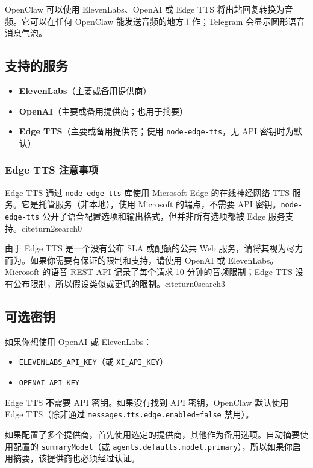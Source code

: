 OpenClaw 可以使用 ElevenLabs、OpenAI 或 Edge TTS 将出站回复转换为音频。它可以在任何 OpenClaw 能发送音频的地方工作；Telegram 会显示圆形语音消息气泡。

\subsection{支持的服务}


\begin{itemize}
  \item \textbf{ElevenLabs}（主要或备用提供商）
  \item \textbf{OpenAI}（主要或备用提供商；也用于摘要）
  \item \textbf{Edge TTS}（主要或备用提供商；使用 \texttt{node-edge-tts}，无 API 密钥时为默认）
\end{itemize}


\subsubsection{Edge TTS 注意事项}


Edge TTS 通过 \texttt{node-edge-tts} 库使用 Microsoft Edge 的在线神经网络 TTS 服务。它是托管服务（非本地），使用 Microsoft 的端点，不需要 API 密钥。\texttt{node-edge-tts} 公开了语音配置选项和输出格式，但并非所有选项都被 Edge 服务支持。citeturn2search0

由于 Edge TTS 是一个没有公布 SLA 或配额的公共 Web 服务，请将其视为尽力而为。如果你需要有保证的限制和支持，请使用 OpenAI 或 ElevenLabs。Microsoft 的语音 REST API 记录了每个请求 10 分钟的音频限制；Edge TTS 没有公布限制，所以假设类似或更低的限制。citeturn0search3

\subsection{可选密钥}


如果你想使用 OpenAI 或 ElevenLabs：

\begin{itemize}
  \item \texttt{ELEVENLABS\_API\_KEY}（或 \texttt{XI\_API\_KEY}）
  \item \texttt{OPENAI\_API\_KEY}
\end{itemize}


Edge TTS \textbf{不}需要 API 密钥。如果没有找到 API 密钥，OpenClaw 默认使用 Edge TTS（除非通过 \texttt{messages.tts.edge.enabled=false} 禁用）。

如果配置了多个提供商，首先使用选定的提供商，其他作为备用选项。自动摘要使用配置的 \texttt{summaryModel}（或 \texttt{agents.defaults.model.primary}），所以如果你启用摘要，该提供商也必须经过认证。

